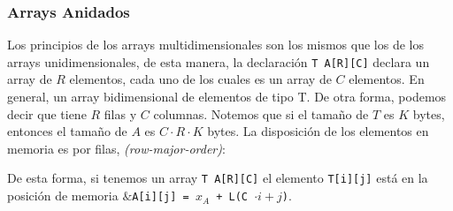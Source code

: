 \subsubsection{Arrays Anidados}
Los principios de los arrays multidimensionales son los mismos que los de los arrays unidimensionales, de esta manera, la declaración
\texttt{T A[R][C]} declara un array de $R$ elementos, cada uno de los cuales es un array de $C$ elementos. En general, un array bidimensional de elementos de tipo T. De otra forma,
podemos decir que tiene $R$ filas y $C$ columnas. Notemos que si el tamaño de $T$ es $K$ bytes, entonces el tamaño de $A$ es $ C \cdot R \cdot K$ bytes.
La disposición de los elementos en memoria es por filas, \textit{(row-major-order)}:
\begin{center}

\end{center}
De esta forma, si tenemos un array \texttt{T A[R][C]} el elemento 
\texttt{T[i][j]} está en la posición de memoria \texttt{$\&$A[i][j] = $x_A$ + L(C $\cdot i + j$)}.
